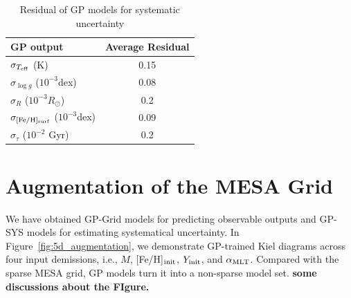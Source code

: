 \begin{table}
	\centering
	\caption{Residual of GP models for systematic uncertainty}
	\label{tab:sys}
	\begin{tabular}{lc}
		\hline
		GP output& Average Residual \\
		\hline
		$\sigma_{T_{\rm eff}}$  (K) & 0.15 \\
		$\sigma_{\log g}$  ($10^{-3}$dex)   & 0.08 \\
		$\sigma_{R}$ ($10^{-3}R_{\odot}$)   & 0.2 \\
		$\sigma_{\rm [Fe/H]_{\rm surf}}$ ($10^{-3}$dex) & 0.09 \\
		$\sigma_{\tau}$ ($10^{-2}$ Gyr)  & 0.2\\
		  \hline
	\end{tabular}
\end{table}


\section{Augmentation of the MESA Grid}

We have obtained GP-Grid models for predicting observable outputs and GP-SYS models for estimating systematical uncertainty. 
In Figure~\ref{fig:5d_augmentation}, we demonstrate GP-trained Kiel diagrams across four input demissions, i.e., $M$, [Fe/H]$_{\rm init}$, $Y_{\rm init}$, and $\alpha_{\rm MLT}$. Compared with the sparse MESA grid, GP models turn it into a non-sparse model set. {\bf some discussions about the FIgure.}

